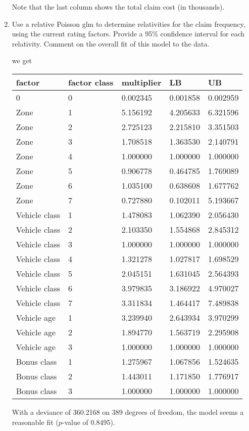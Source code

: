 \documentclass[11pt]{article}
\begin{document}
\begin{enumerate}
Note that the last column shows the total claim cost (in thousands).

\newpage
\item Use a relative Poisson glm to determine relativities for the claim frequency, using the current rating factors.
Provide a 95\% confidence interval for each relativity. Comment on the overall fit of this model to the data.

 we get

\begin{tabular}{lllll}
\hline
factor & factor class & multiplier & LB & UB\\
\hline
0&0&0.002345&0.001858&0.002959\\
Zone&1&5.156192&4.205633&6.321596\\
Zone&2&2.725123&2.215810&3.351503\\
Zone&3&1.708518&1.363530&2.140791\\
Zone&4&1.000000&1.000000&1.000000\\
Zone&5&0.906778&0.464785&1.769089\\
Zone&6&1.035100&0.638608&1.677762\\
Zone&7&0.727880&0.102011&5.193667\\
Vehicle class&1&1.478083&1.062390&2.056430\\
Vehicle class&2&2.103350&1.554868&2.845312\\
Vehicle class&3&1.000000&1.000000&1.000000\\
Vehicle class&4&1.321278&1.027817&1.698529\\
Vehicle class&5&2.045151&1.631045&2.564393\\
Vehicle class&6&3.979835&3.186922&4.970027\\
Vehicle class&7&3.311834&1.464417&7.489838\\
Vehicle age&1&3.239940&2.643934&3.970299\\
Vehicle age&2&1.894770&1.563719&2.295908\\
Vehicle age&3&1.000000&1.000000&1.000000\\
Bonus class&1&1.275967&1.067856&1.524635\\
Bonus class&2&1.443011&1.171850&1.776917\\
Bonus class&3&1.000000&1.000000&1.000000\\
\hline
\end{tabular}

With a deviance of 360.2168 on 389 degrees of freedom, the model seems a reasonable fit ($p$-value of 0.8495).


\end{enumerate}
\end{document}
